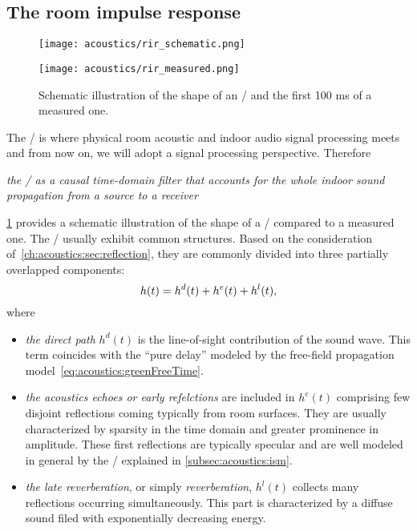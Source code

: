 \subsection{The room impulse response}\label{ch:acoustics:subsec:rir}
\begin{figure}[t]
    \begin{fullwidth}

        \begin{minipage}[b]{.5\textwidth}
            \centering
            \texttt{[image: acoustics/rir\_schematic.png]}
        \end{minipage}%
        \begin{minipage}[b]{.5\textwidth}
        \centering
        \texttt{[image: acoustics/rir\_measured.png]}
    \end{minipage}
    \caption{Schematic illustration of the shape of an \RIR/ and the first 100 ms of a measured one.}
    \label{fig:acoustics:rir}
    \end{fullwidth}
\end{figure}
The \RIRdef/ is where physical room acoustic and indoor audio signal processing meets and from now on, we will adopt a signal processing perspective.
Therefore
\begin{center}
\textit{the \RIR/ as a causal time-domain filter that accounts for the whole indoor sound propagation
from a source to a receiver}
\end{center}
\cref{fig:acoustics:rir} provides a schematic illustration of the shape of a \RIR/ compared to a measured one.
The \RIRs/ usually exhibit common structures.
Based on the consideration of~\cref{ch:acoustics:sec:reflection}, they are commonly divided into three partially overlapped components:
\begin{equation}\label{eq:acoustics:rir_full}
h(t) = h^d(t) + h^e(t) + h^l(t)
,
\end{equation}
where

\begin{itemize}
    \item \textit{the direct path} $h^d(t)$ is the line-of-sight contribution of the sound wave.
    This term coincides with the ``pure delay'' modeled by the free-field propagation model~\eqref{eq:acoustics:greenFreeTime}.

    \item \textit{the acoustics echoes or early refelctions} are included in $h^e(t)$ comprising few disjoint reflections coming typically from room surfaces.
    They are usually characterized by sparsity in the time domain and greater prominence in amplitude.
    These first reflections are typically specular and are well modeled in general by the \ISMdef/ explained in \cref{subsec:acoustics:ism}.

    \item \textit{the late reverberation}, or simply \textit{reverberation}, $h^l(t)$ collects many reflections occurring simultaneously.
    This part is characterized by a diffuse sound filed with exponentially decreasing energy.
\end{itemize}

